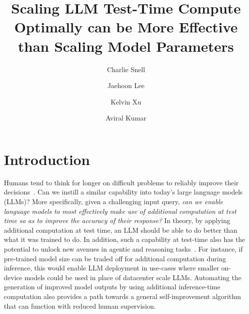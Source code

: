 \documentclass[11pt, letterpaper, logo]{googledeepmind}
\title{Scaling LLM Test-Time Compute Optimally can be More Effective than Scaling Model Parameters}
\author[$\vardiamondsuit$, 1]{Charlie Snell}
\author[2]{Jaehoon Lee}
\author[$\clubsuit$, 2]{Kelvin Xu}
\author[$\clubsuit$, 2]{Aviral Kumar}
\affil[$\clubsuit$]{Equal advising}
\affil[1]{UC Berkeley}
\affil[2]{Google DeepMind}
\affil[$\vardiamondsuit$]{Work done during an internship at Google DeepMind}
\begin{document}
\maketitle

\newcommand{\expect}[2]{\mathds{E}_{{#1}} \left[ {#2} \right]}
\newcommand{\myvec}[1]{\boldsymbol{#1}}
\newcommand{\myvecsym}[1]{\boldsymbol{#1}}
\newcommand{\vx}{\myvec{x}}
\newcommand{\vy}{\myvec{y}}
\newcommand{\vz}{\myvec{z}}
\newcommand{\vtheta}{\myvecsym{\theta}}

\vspace{-0.25cm}
\section{Introduction}
\vspace{-0.2cm}

Humans tend to think for longer on difficult problems to reliably improve their decisions~\citep{kahneman2013thinking,evans1984heuristic,kahneman2003maps}.
Can we instill a similar capability into today's large language models (LLMs)?  More specifically, given a challenging input query, \emph{can we enable language models to most effectively make use of additional computation at test time so as to improve the accuracy of their response?} In theory, by applying additional computation at test time, an LLM should be able to do better than what it was trained to do. In addition, such a capability at test-time also has the potential to unlock new avenues in agentic and reasoning tasks~\citep{shinn2023reflexion,wei2023chainofthought,qu2024recursive}.
For instance, if pre-trained model size can be traded off for additional computation during inference, this would enable LLM deployment in use-cases where smaller on-device models could be used in place of datacenter scale LLMs.
Automating the generation of improved model outputs by using additional inference-time computation also provides a path towards a general self-improvement algorithm that can function with reduced human supervision.
\end{document}
